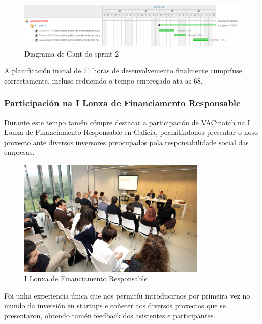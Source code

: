         \begin{figure}[h!]
          \begin{center}
          \includegraphics[width=\textwidth]{./img/gant_diagrams/02.png}
          \caption{Diagrama de Gant do sprint 2}
          \label{fig:gant02}
          \end{center}
        \end{figure}

  A planificación inicial de 71 horas de desenvolvemento finalmente cumpríuse 
correctamente, incluso reducindo o tempo empregado ata as 68.

    \subsubsection{Participación na I Lonxa de Financiamento Responsable}
    \label{sec:lonxa}
    Durante este tempo tamén cómpre destacar a participación de VACmatch na I 
Lonxa de Financiamento Responsable en Galicia, permitíndonos presentar o noso 
proxecto ante diversos inversores preocupados pola responsabilidade social das 
empresas.

    \begin{figure}[h!]
          \begin{center}
          \includegraphics[width=0.8\textwidth]{./img/inversion_responsable.jpg}
          \caption{I Lonxa de Financiamento Responsable}
          \label{fig:lonxa}
          \end{center}
    \end{figure}

        Foi unha experiencia única que nos permitíu introducirnos por primeira 
vez no mundo da inversión en startups e coñecer aos diversos proxectos que se 
presentaron, obtendo tamén feedback dos asistentes e participantes.

